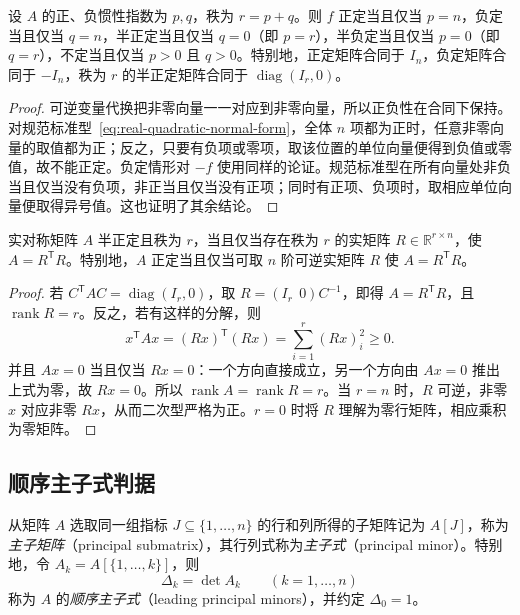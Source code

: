 \begin{theorem}
\label{thm:definiteness-inertia}
设 $A$ 的正、负惯性指数为 $p,q$，秩为 $r=p+q$。则 $f$ 正定当且仅当 $p=n$，负定当且仅当 $q=n$，半正定当且仅当 $q=0$（即 $p=r$），半负定当且仅当 $p=0$（即 $q=r$），不定当且仅当 $p>0$ 且 $q>0$。特别地，正定矩阵合同于 $I_n$，负定矩阵合同于 $-I_n$，秩为 $r$ 的半正定矩阵合同于 $\operatorname{diag}(I_r,0)$。
\end{theorem}
\begin{proof}
可逆变量代换把非零向量一一对应到非零向量，所以正负性在合同下保持。对规范标准型~\eqref{eq:real-quadratic-normal-form}，全体 $n$ 项都为正时，任意非零向量的取值都为正；反之，只要有负项或零项，取该位置的单位向量便得到负值或零值，故不能正定。负定情形对 $-f$ 使用同样的论证。规范标准型在所有向量处非负当且仅当没有负项，非正当且仅当没有正项；同时有正项、负项时，取相应单位向量便取得异号值。这也证明了其余结论。
\end{proof}

\begin{proposition}
\label{prop:positive-semidefinite-gram}
实对称矩阵 $A$ 半正定且秩为 $r$，当且仅当存在秩为 $r$ 的实矩阵 $R\in\mathbb R^{r\times n}$，使 $A=R^{\mathsf T}R$。特别地，$A$ 正定当且仅当可取 $n$ 阶可逆实矩阵 $R$ 使 $A=R^{\mathsf T}R$。
\end{proposition}
\begin{proof}
若 $C^{\mathsf T}AC=\operatorname{diag}(I_r,0)$，取 $R=(I_r\ \ 0)C^{-1}$，即得 $A=R^{\mathsf T}R$，且 $\operatorname{rank}R=r$。反之，若有这样的分解，则
\[
    x^{\mathsf T}Ax=(Rx)^{\mathsf T}(Rx)=\sum_{i=1}^r(Rx)_i^2\geq0.
\]
并且 $Ax=0$ 当且仅当 $Rx=0$：一个方向直接成立，另一个方向由 $Ax=0$ 推出上式为零，故 $Rx=0$。所以 $\operatorname{rank}A=\operatorname{rank}R=r$。当 $r=n$ 时，$R$ 可逆，非零 $x$ 对应非零 $Rx$，从而二次型严格为正。$r=0$ 时将 $R$ 理解为零行矩阵，相应乘积为零矩阵。
\end{proof}

\subsection{顺序主子式判据}

\begin{definition}
\label{def:principal-minors-quadratic}
从矩阵 $A$ 选取同一组指标 $J\subseteq\{1,\ldots,n\}$ 的行和列所得的子矩阵记为 $A[J]$，称为\emph{主子矩阵}（principal submatrix），其行列式称为\emph{主子式}（principal minor）。特别地，令 $A_k=A[\{1,\ldots,k\}]$，则
\[
    \Delta_k=\det A_k\qquad(k=1,\ldots,n)
\]
称为 $A$ 的\emph{顺序主子式}（leading principal minors），并约定 $\Delta_0=1$。
\end{definition}

